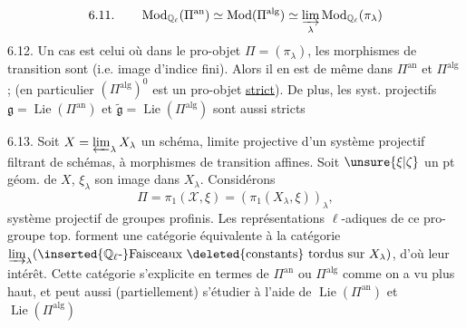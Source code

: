 \[
6.11.\qquad \operatorname{Mod}_{\mathbb{Q}_\ell}(\Pi^{\mathrm{an}})\simeq
\operatorname{Mod}(\Pi^{\mathrm{alg}})\simeq
\varinjlim_\lambda\operatorname{Mod}_{\mathbb{Q}_\ell}(\pi_\lambda)
\]
6.12. Un cas  est celui où dans le 
pro-objet $\Pi=(\pi_\lambda)$, les morphismes de transition sont
 (i.e. image d'indice fini). Alors il en est de même
dans $\Pi^{\mathrm{an}}$ et $\Pi^{\mathrm{alg}}$ ; (en particulier
$(\Pi^{\mathrm{alg}})^0$ est un pro-objet \uline{strict}). De plus, les syst.
projectifs $\mathfrak{g}=\operatorname{Lie}(\Pi^{\mathrm{an}})$ et
$\widetilde{\mathfrak{g}}=\operatorname{Lie}(\Pi^{\mathrm{alg}})$ sont aussi
stricts 

6.13. Soit $X=\varprojlim_\lambda X_\lambda$ un schéma, limite projective
d'un système projectif filtrant 
de schémas, à morphismes de transition affines. Soit $\unsure{\xi|\zeta}$ un pt géom.
de $X$, $\xi_\lambda$ son image dans $X_\lambda$. Considérons
\[
\Pi=\pi_1(\mathscr{X},\xi)=(\pi_1(X_\lambda,\xi))_\lambda,
\]
système projectif de groupes profinis. Les représentations
$\ell$-adiques de ce  pro-groupe top. forment une
catégorie équivalente à la catégorie
$\varinjlim_\lambda(\inserted{\mathbb{Q}_\ell\text{-}}\text{Faisceaux
\deleted{constants} tordus sur }X_\lambda)$, d'où leur intérêt. Cette
catégorie s'explicite en termes de $\Pi^{\mathrm{an}}$ ou $\Pi^{\mathrm{alg}}$
comme on a vu plus haut, et peut aussi (partiellement) s'étudier à l'aide
de $\operatorname{Lie}(\Pi^{\mathrm{an}})$ et
$\operatorname{Lie}(\Pi^{\mathrm{alg}})$
